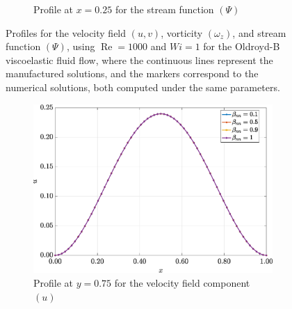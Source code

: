 \documentclass[preprint, 12pt]{elsarticle}
\begin{document}
\begin{figure}[H]
\begin{subfigure}[b]{.46\textwidth}
        \caption{Profile at $x=0.25$ for the stream function $(\Psi)$}
        \label{fig_slice_x_psi_2nd_Case1_oldorydb}
    \end{subfigure}
    \vspace{0.2cm}
    \caption{Profiles for the velocity field $(u,v)$, vorticity $(\omega_{z})$, and stream function $(\Psi)$, using $\operatorname{Re}=1000$ and $Wi=1$ for the Oldroyd-B viscoelastic fluid flow, where the continuous lines represent the manufactured solutions, and the markers correspond to the numerical solutions, both computed under the same parameters.\label{fig_slice_Solution_uvwzpsi_oldroydb_x}}
\end{figure}

\begin{figure}[H]
    \centering
    \begin{subfigure}[b]{.46\textwidth}
        \includegraphics[width=\textwidth]{Slice_y_Tog_Numerical_NormErr_2nd_Betann_1_Re_1000_Wi_1_epsilon_0_xi_0_alphaG_0_Dt_1e-06_at_0.05_tipsim_1_MMS_12_x0.75y0.75_U.eps}
        \caption{Profile at $y=0.75$ for the velocity field component $(u)$}
        \label{fig_slice_y_u_2nd_Case1_oldorydb}
    \end{subfigure}
    \vspace{0.2cm}
    \qquad
    \begin{subfigure}[b]{.46\textwidth}

\end{subfigure}
\end{figure}
\end{document}

